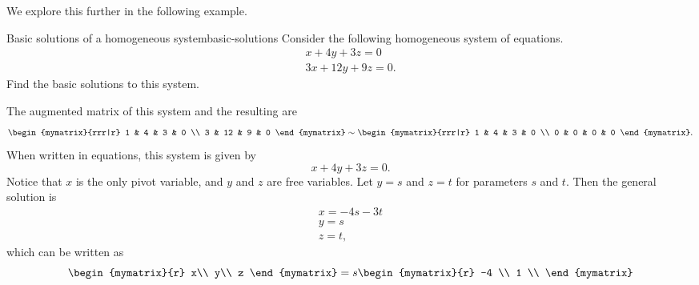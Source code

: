 We explore this further in the following example.

\begin{example}{Basic solutions of a homogeneous system}{basic-solutions}
  Consider the following homogeneous system of equations. 
  \begin{equation}\label{eqn:basic-solutions-1}
    \begin{array}{c}
      x + 4y + 3z = 0 \\
      3x + 12y + 9z = 0.
    \end{array}
  \end{equation}
  Find the basic solutions to this system.
\end{example}

\begin{solution}
  The augmented matrix of this system and the resulting {\rref} are 
  \begin{equation*}
    \begin{mymatrix}{rrr|r}
      1 & 4 & 3 & 0 \\
      3 & 12 & 9 & 0
    \end{mymatrix}
    \sim
    \begin{mymatrix}{rrr|r}
      1 & 4 & 3 & 0 \\
      0 & 0 & 0 & 0
    \end{mymatrix}.
  \end{equation*}
  When written in equations, this system is given by 
  \begin{equation*}
    x + 4y +3z=0.
  \end{equation*}
  Notice that $x$ is the only pivot variable, and $y$ and $z$ are free
  variables. Let $y = s$ and $z=t$ for parameters $s$ and $t$. Then the
  general solution is
  \begin{equation*}
    \begin{array}{c}
      x = -4s - 3t \\
      y = s \\
      z = t,
    \end{array}
  \end{equation*}
  which can be written as 
  \begin{equation*}
    \begin{mymatrix}{r}
      x\\
      y\\
      z
    \end{mymatrix}
    =
    s
    \begin{mymatrix}{r}
      -4 \\
      1 \\

\end{mymatrix}
\end{equation*}
\end{solution}
